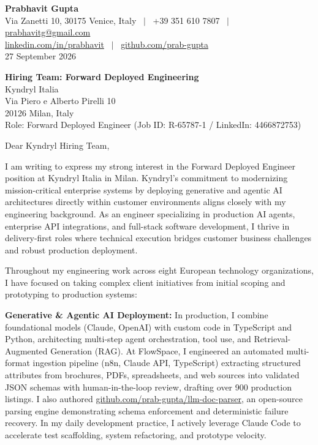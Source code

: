 \documentclass[10.5pt,a4paper]{article}
\begin{document}
\textbf{\large Prabhavit Gupta}\\
Via Zanetti 10, 30175 Venice, Italy ~$\vert$~ +39 351 610 7807 ~$\vert$~ \href{mailto:prabhavitg@gmail.com}{prabhavitg@gmail.com}\\
\href{https://www.linkedin.com/in/prabhavit/}{linkedin.com/in/prabhavit} ~$\vert$~ \href{https://github.com/prab-gupta}{github.com/prab-gupta}\\
27 September 2026

\textbf{Hiring Team: Forward Deployed Engineering}\\
Kyndryl Italia\\
Via Piero e Alberto Pirelli 10\\
20126 Milan, Italy\\
Role: Forward Deployed Engineer (Job ID: R-65787-1 / LinkedIn: 4466872753)

Dear Kyndryl Hiring Team,

I am writing to express my strong interest in the Forward Deployed Engineer position at Kyndryl Italia in Milan. Kyndryl's commitment to modernizing mission-critical enterprise systems by deploying generative and agentic AI architectures directly within customer environments aligns closely with my engineering background. As an engineer specializing in production AI agents, enterprise API integrations, and full-stack software development, I thrive in delivery-first roles where technical execution bridges customer business challenges and robust production deployment.

Throughout my engineering work across eight European technology organizations, I have focused on taking complex client initiatives from initial scoping and prototyping to production systems:

\textbf{Generative \& Agentic AI Deployment:} In production, I combine foundational models (Claude, OpenAI) with custom code in TypeScript and Python, architecting multi-step agent orchestration, tool use, and Retrieval-Augmented Generation (RAG). At FlowSpace, I engineered an automated multi-format ingestion pipeline (n8n, Claude API, TypeScript) extracting structured attributes from brochures, PDFs, spreadsheets, and web sources into validated JSON schemas with human-in-the-loop review, drafting over 900 production listings. I also authored \href{https://github.com/prab-gupta/llm-doc-parser}{github.com/prab-gupta/llm-doc-parser}, an open-source parsing engine demonstrating schema enforcement and deterministic failure recovery. In my daily development practice, I actively leverage Claude Code to accelerate test scaffolding, system refactoring, and prototype velocity.
\end{document}
